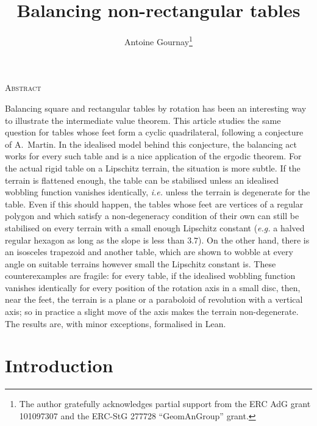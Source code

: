 \documentclass[a4paper,11pt,twoside,leqno]{article}
\newcommand{\eg}[0]{\emph{e.g.} }
\newcommand{\ie}[0]{\emph{i.e.} }
\numberwithin{equation}{section}
\renewcommand{\thefootnote}{\fnsymbol{footnote}}
\begin{document}
\title{Balancing non-rectangular tables}

\author{Antoine Gournay\footnote{The author gratefully acknowledges partial support from the ERC AdG grant 101097307 and the ERC-StG 277728 ``GeomAnGroup'' grant.}}


\maketitle


\renewcommand{\thefootnote}{\arabic{footnote}}




\centerline{\textsc{Abstract}}


\begin{center}
\parbox{10cm}{{ \small
Balancing square and rectangular tables by rotation has been an interesting way to illustrate the intermediate value theorem.
This article studies the same question for tables whose feet form a cyclic quadrilateral, following a conjecture of A.~Martin. In the idealised model behind this conjecture, the balancing act works for every such table and is a nice application of the ergodic theorem. For the actual rigid table on a Lipschitz terrain, the situation is more subtle. If the terrain is flattened enough, the table can be stabilised unless an idealised wobbling function vanishes identically, \ie unless the terrain is degenerate for the table. Even if this should happen, the tables whose feet are vertices of a regular polygon and which satisfy a non-degeneracy condition of their own can still be stabilised on every terrain with a small enough Lipschitz constant (\eg a halved regular hexagon as long as the slope is less than $3.7$\textdegree{}). On the other hand, there is an isosceles trapezoid and another table, which are shown to wobble at every angle on suitable terrains however small the Lipschitz constant is. These counterexamples are fragile: for every table, if the idealised wobbling function vanishes identically for every position of the rotation axis in a small disc, then, near the feet, the terrain is a plane or a paraboloid of revolution with a vertical axis; so in practice a slight move of the axis makes the terrain non-degenerate. The results are, with minor exceptions, formalised in Lean.

\hspace*{.1ex} 
}}
\end{center}

\section{Introduction}\label{s-intro}
\end{document}
